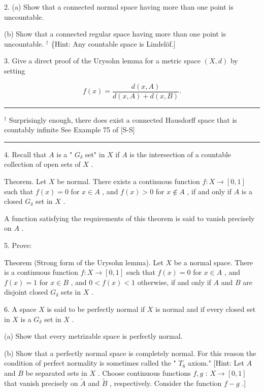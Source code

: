 \documentclass[10pt]{article}
\newcommand{\HRule}{\begin{center}\rule{0.9\linewidth}{0.2mm}\end{center}}
\begin{document}
2. (a) Show that a connected normal space having more than one point is uncountable.

(b) Show that a connected regular space having more than one point is uncountable. \({}^{ \dagger  }\) \{Hint: Any countable space is Lindelöf.]

3. Give a direct proof of the Urysohn lemma for a metric space \(\left( {X,d}\right)\) by setting

\[
f\left( x\right)  = \frac{d\left( {x,A}\right) }{d\left( {x,A}\right)  + d\left( {x,B}\right) }.
\]

\HRule

\({}^{ \dagger  }\) Surprisingly enough, there does exist a connected Hausdorff space that is countably infinite See Example 75 of [S-S]

\HRule

4. Recall that \(A\) is a " \({G}_{\delta }\) set" in \(X\) if \(A\) is the intersection of a countable collection of open sets of \(X\) .

Theorem. Let \(X\) be normal. There exists a continuous function \(f : X \rightarrow  \left\lbrack  {0,1}\right\rbrack\) such that \(f\left( x\right)  = 0\) for \(x \in  A\) , and \(f\left( x\right)  > 0\) for \(x \notin  A\) , if and only if \(A\) is a closed \({G}_{\delta }\) set in \(X\) .

A function satisfying the requirements of this theorem is said to vanish precisely on \(A\) .

5. Prove:

Theorem (Strong form of the Urysohn lemma). Let \(X\) be a normal space. There is a continuous function \(f : X \rightarrow  \left\lbrack  {0,1}\right\rbrack\) such that \(f\left( x\right)  = 0\) for \(x \in  A\) , and \(f\left( x\right)  = 1\) for \(x \in  B\) , and \(0 < f\left( x\right)  < 1\) otherwise, if and only if \(A\) and \(B\) are disjoint closed \({G}_{\delta }\) sets in \(X\) .

6. A space \(X\) is said to be perfectly normal if \(X\) is normal and if every closed set in \(X\) is a \({G}_{\delta }\) set in \(X\) .

(a) Show that every metrizable space is perfectly normal.

(b) Show that a perfectly normal space is completely normal. For this reason the condition of perfect normality is sometimes called the " \({T}_{6}\) axiom." [Hint: Let \(A\) and \(B\) be separated sets in \(X\) . Choose continuous functions \(f,g\) : \(X \rightarrow  \left\lbrack  {0,1}\right\rbrack\) that vanish precisely on \(\widetilde{A}\) and \(\widetilde{B}\) , respectively. Consider the function \(f - g\) .]
\end{document}
